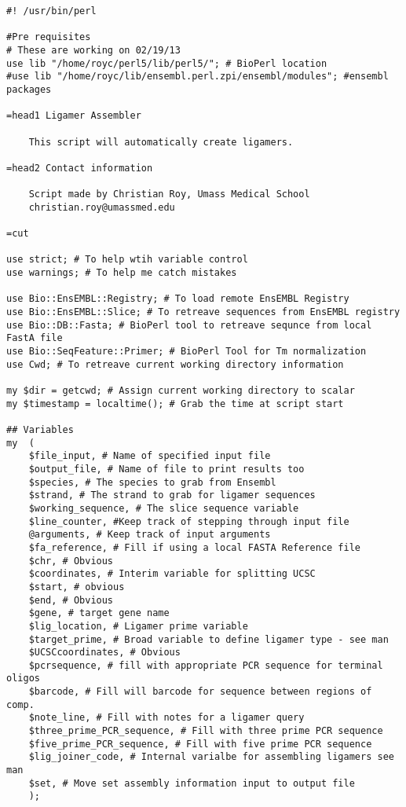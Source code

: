 \lstset{language=PERL}
\begin{lstlisting}
#! /usr/bin/perl

#Pre requisites
# These are working on 02/19/13
use lib "/home/royc/perl5/lib/perl5/"; # BioPerl location
#use lib "/home/royc/lib/ensembl.perl.zpi/ensembl/modules"; #ensembl packages

=head1 Ligamer Assembler

	This script will automatically create ligamers.

=head2 Contact information

	Script made by Christian Roy, Umass Medical School
	christian.roy@umassmed.edu

=cut

use strict; # To help wtih variable control
use warnings; # To help me catch mistakes

use Bio::EnsEMBL::Registry; # To load remote EnsEMBL Registry
use Bio::EnsEMBL::Slice; # To retreave sequences from EnsEMBL registry
use Bio::DB::Fasta; # BioPerl tool to retreave sequnce from local FastA file
use Bio::SeqFeature::Primer; # BioPerl Tool for Tm normalization
use Cwd; # To retreave current working directory information

my $dir = getcwd; # Assign current working directory to scalar
my $timestamp = localtime(); # Grab the time at script start

## Variables
my 	(
	$file_input, # Name of specified input file
	$output_file, # Name of file to print results too
	$species, # The species to grab from Ensembl
	$strand, # The strand to grab for ligamer sequences
	$working_sequence, # The slice sequence variable
	$line_counter, #Keep track of stepping through input file
	@arguments, # Keep track of input arguments
	$fa_reference, # Fill if using a local FASTA Reference file
	$chr, # Obvious
	$coordinates, # Interim variable for splitting UCSC
	$start, # obvious
	$end, # Obvious
	$gene, # target gene name
	$lig_location, # Ligamer prime variable
	$target_prime, # Broad variable to define ligamer type - see man
	$UCSCcoordinates, # Obvious
	$pcrsequence, # fill with appropriate PCR sequence for terminal oligos
	$barcode, # Fill will barcode for sequence between regions of comp.
	$note_line, # Fill with notes for a ligamer query
	$three_prime_PCR_sequence, # Fill with three prime PCR sequence
	$five_prime_PCR_sequence, # Fill with five prime PCR sequence
	$lig_joiner_code, # Internal varialbe for assembling ligamers see man
	$set, # Move set assembly information input to output file
	);


\end{lstlisting}

